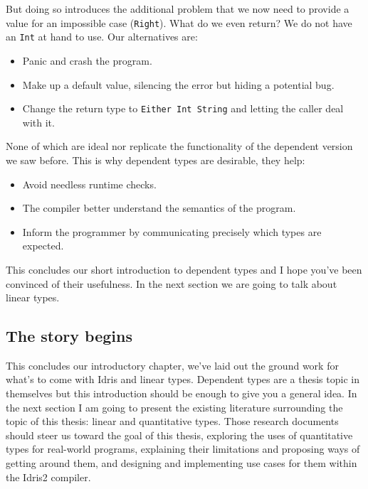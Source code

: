\documentclass[
]{article}
\providecommand{\tightlist}{%
  \setlength{\itemsep}{0pt}\setlength{\parskip}{0pt}}
\begin{document}
But doing so introduces the additional problem that we now need to
provide a value for an impossible case (\texttt{Right}). What do we even
return? We do not have an \texttt{Int} at hand to use. Our alternatives
are:

\begin{itemize}
\tightlist
\item
  Panic and crash the program.
\item
  Make up a default value, silencing the error but hiding a potential
  bug.
\item
  Change the return type to \texttt{Either\ Int\ String} and letting the
  caller deal with it.
\end{itemize}

None of which are ideal nor replicate the functionality of the dependent
version we saw before. This is why dependent types are desirable, they
help:

\begin{itemize}
\tightlist
\item
  Avoid needless runtime checks.
\item
  The compiler better understand the semantics of the program.
\item
  Inform the programmer by communicating precisely which types are
  expected.
\end{itemize}

This concludes our short introduction to dependent types and I hope
you've been convinced of their usefulness. In the next section we are
going to talk about linear types.

\hypertarget{the-story-begins}{%
\subsection{The story begins}\label{the-story-begins}}

This concludes our introductory chapter, we've laid out the ground work
for what's to come with Idris and linear types. Dependent types are a
thesis topic in themselves but this introduction should be enough to
give you a general idea. In the next section I am going to present the
existing literature surrounding the topic of this thesis: linear and
quantitative types. Those research documents should steer us toward the
goal of this thesis, exploring the uses of quantitative types for
real-world programs, explaining their limitations and proposing ways of
getting around them, and designing and implementing use cases for them
within the Idris2 compiler.
\end{document}
